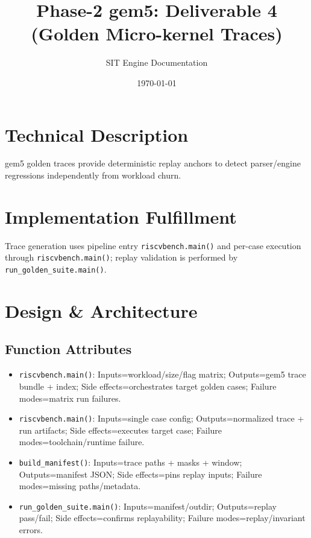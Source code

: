 \documentclass[11pt,a4paper]{article}
\title{Phase-2 gem5: Deliverable 4 (Golden Micro-kernel Traces)}
\author{SIT Engine Documentation}
\date{\today}
\begin{document}
\maketitle

\section{Technical Description}
gem5 golden traces provide deterministic replay anchors to detect parser/engine regressions independently from workload churn.

\section{Implementation Fulfillment}
Trace generation uses pipeline entry \texttt{riscvbench.main()} and per-case execution through \texttt{riscvbench.main()}; replay validation is performed by \texttt{run\_golden\_suite.main()}.

\section{Design \& Architecture}
\subsection*{Function Attributes}
\begin{itemize}[leftmargin=*]
  \item \texttt{riscvbench.main()}: Inputs=workload/size/flag matrix; Outputs=gem5 trace bundle + index; Side effects=orchestrates target golden cases; Failure modes=matrix run failures.
  \item \texttt{riscvbench.main()}: Inputs=single case config; Outputs=normalized trace + run artifacts; Side effects=executes target case; Failure modes=toolchain/runtime failure.
  \item \texttt{build\_manifest()}: Inputs=trace paths + masks + window; Outputs=manifest JSON; Side effects=pins replay inputs; Failure modes=missing paths/metadata.
  \item \texttt{run\_golden\_suite.main()}: Inputs=manifest/outdir; Outputs=replay pass/fail; Side effects=confirms replayability; Failure modes=replay/invariant errors.
\end{itemize}
\end{document}

